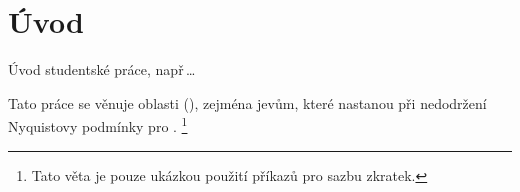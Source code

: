 \chapter*{Úvod}
{}


Úvod studentské práce, např\,\dots

Tato práce se věnuje oblasti  (), zejména jevům, které nastanou při nedodržení Nyquistovy podmínky pro .%
\footnote{Tato věta je pouze ukázkou použití příkazů pro sazbu zkratek.}